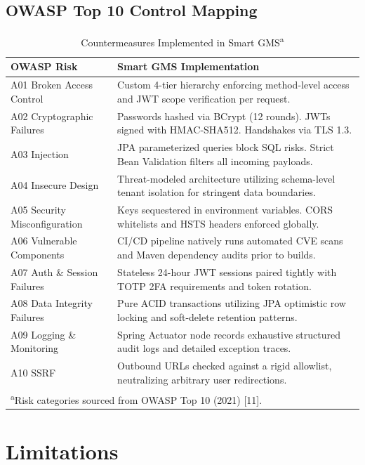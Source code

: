 \subsection{OWASP Top 10 Control
Mapping}\label{owasp-top-10-control-mapping}

\begin{table}[H]
\centering
\scriptsize
\renewcommand{\arraystretch}{1.1}
\caption{Countermeasures Implemented in Smart GMS\textsuperscript{a}}
\begin{tabular}{@{} p{2.5cm} p{5.4cm} @{}}
\toprule
\textbf{OWASP Risk} & \textbf{Smart GMS Implementation} \\
\midrule
A01 Broken Access Control &
  Custom 4-tier hierarchy enforcing method-level access and JWT scope verification per request. \\
A02 Cryptographic Failures &
  Passwords hashed via BCrypt (12 rounds). JWTs signed with HMAC-SHA512. Handshakes via TLS 1.3. \\
A03 Injection &
  JPA parameterized queries block SQL risks. Strict Bean Validation filters all incoming payloads. \\
A04 Insecure Design &
  Threat-modeled architecture utilizing schema-level tenant isolation for stringent data boundaries. \\
A05 Security Misconfiguration &
  Keys sequestered in environment variables. CORS whitelists and HSTS headers enforced globally. \\
A06 Vulnerable Components &
  CI/CD pipeline natively runs automated CVE scans and Maven dependency audits prior to builds. \\
A07 Auth \& Session Failures &
  Stateless 24-hour JWT sessions paired tightly with TOTP 2FA requirements and token rotation. \\
A08 Data Integrity Failures &
  Pure ACID transactions utilizing JPA optimistic row locking and soft-delete retention patterns. \\
A09 Logging \& Monitoring &
  Spring Actuator node records exhaustive structured audit logs and detailed exception traces. \\
A10 SSRF &
  Outbound URLs checked against a rigid allowlist, neutralizing arbitrary user redirections. \\
\bottomrule
\multicolumn{2}{l}{\textsuperscript{a}\footnotesize{Risk categories sourced from OWASP Top 10 (2021) [11].}}
\end{tabular}
\end{table}

\section{Limitations}\label{limitations}


